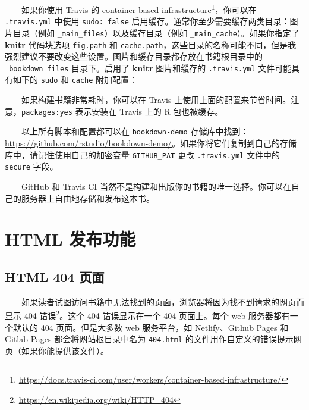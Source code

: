 \documentclass[
  12pt,
]{krantz}
\newenvironment{Shaded}{\begin{snugshade}}{\end{snugshade}}
\newcommand{\AttributeTok}[1]{\textcolor[rgb]{0.13,0.29,0.53}{#1}}
\newcommand{\CharTok}[1]{\textcolor[rgb]{0.31,0.60,0.02}{#1}}
\newcommand{\FunctionTok}[1]{\textcolor[rgb]{0.13,0.29,0.53}{\textbf{#1}}}
\newcommand{\KeywordTok}[1]{\textcolor[rgb]{0.13,0.29,0.53}{\textbf{#1}}}
\renewcommand{\href}[2]{#2\footnote{\url{#1}}}
\theoremstyle{definition}
\theoremstyle{definition}
\theoremstyle{definition}
\theoremstyle{definition}
\theoremstyle{remark}
\begin{document}
  如果你使用 Travis 的 \href{https://docs.travis-ci.com/user/workers/container-based-infrastructure/}{container-based infrastructure}，你可以在 \texttt{.travis.yml} 中使用 \texttt{sudo:\ false} 启用缓存。通常你至少需要缓存两类目录：图片目录（例如 \texttt{\_main\_files}）以及缓存目录（例如 \texttt{\_main\_cache}）。如果你指定了 \textbf{knitr} 代码块选项 \texttt{fig.path} 和 \texttt{cache.path}，这些目录的名称可能不同，但是我强烈建议不要改变这些设置。图片和缓存目录都存放在书籍根目录中的 \texttt{\_bookdown\_files} 目录下。启用了 \textbf{knitr} 图片和缓存的 \texttt{.travis.yml} 文件可能具有如下的 \texttt{sudo} 和 \texttt{cache} 附加配置：

\begin{Shaded}
\end{Shaded}

  如果构建书籍非常耗时，你可以在 Travis 上使用上面的配置来节省时间。注意，\texttt{packages:yes} 表示安装在 Travis 上的 R 包也被缓存。

  以上所有脚本和配置都可以在 \texttt{bookdown-demo} 存储库中找到：\url{https://github.com/rstudio/bookdown-demo/}。如果你将它们复制到自己的存储库中，请记住使用自己的加密变量 \texttt{GITHUB\_PAT} 更改 \texttt{.travis.yml} 文件中的 \texttt{secure} 字段。

  GitHub 和 Travis CI 当然不是构建和出版你的书籍的唯一选择。你可以在自己的服务器上自由地存储和发布这本书。

\hypertarget{html-ux53d1ux5e03ux529fux80fd}{%
\section{HTML 发布功能}\label{html-ux53d1ux5e03ux529fux80fd}}

\hypertarget{html-404}{%
\subsection{HTML 404 页面}\label{html-404}}

  如果读者试图访问书籍中无法找到的页面，浏览器将因为找不到请求的网页而显示 \href{https://en.wikipedia.org/wiki/HTTP_404}{404 错误}。这个 404 错误显示在一个 404 页面上。每个 web 服务器都有一个默认的 404 页面。但是大多数 web 服务平台，如 Netlify、Github Pages 和 Gitlab Pages 都会将网站根目录中名为 \texttt{404.html} 的文件用作自定义的错误提示网页（如果你能提供该文件）。
\end{document}
